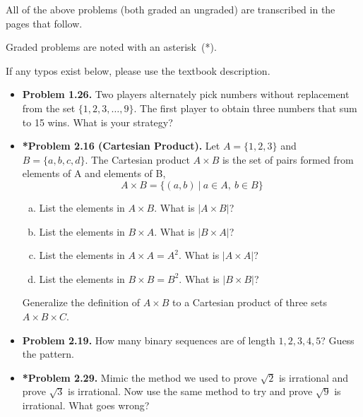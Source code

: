 \documentclass[11pt]{article}
\begin{document}
All of the above problems (both graded an ungraded)
are transcribed in the pages that follow.

Graded problems are noted with an asterisk~(*).

If any typos exist below, please use the textbook description.

\newpage
\begin{itemize}

\item \textbf{Problem 1.26.}
  Two players alternately pick numbers without replacement
  from the set $\{1,2,3,\ldots,9\}$.
  The first player to obtain three numbers that sum to 15 wins.
  What is your strategy?

\vspace{0.1in}

\item \textbf{*Problem 2.16 (Cartesian Product).}
  Let $A=\{1,2,3\}$ and $B=\{a,b,c,d\}$.
  The Cartesian product $A\times B$ is the set of pairs formed
  from elements of A and elements of B,
  $$A\times B = \{(a,b)\ |\ a\in A,\ b\in B\}$$

  \begin{enumerate}[(a)]
  \item List the elements in $A\times B$.
    What is $|A\times B|$?
  \item List the elements in $B\times A$.
    What is $|B\times A|$?
  \item List the elements in $A\times A=A^2$.
    What is $|A\times A|$?
  \item List the elements in $B\times B=B^2$.
    What is $|B\times B|$?
  \end{enumerate}

  Generalize the definition of $A\times B$ to a Cartesian product
  of three sets $A\times B\times C$.

\vspace{0.1in}

\item \textbf{Problem 2.19.}
  How many binary sequences are of length $1,2,3,4,5$?
  Guess the pattern.

\vspace{0.1in}

\item \textbf{*Problem 2.29.}
  Mimic the method we used to prove $\sqrt{2}$ is irrational and
  prove $\sqrt{3}$ is irrational.
  Now use the same method to try and prove $\sqrt{9}$ is irrational.
  What goes wrong?

\vspace{0.1in}


\end{itemize}
\end{document}

